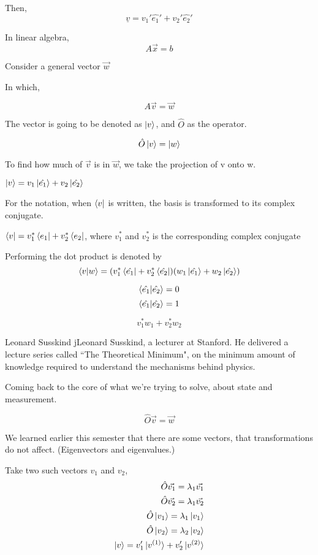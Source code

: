 \documentclass{report}
\begin{document}
Then, $$\underline{v} = v_1' \hat{e_1}' + v_2' \hat{e_2}'$$

 In linear algebra,
$$A\vec{x} = b$$

Consider a general vector $\vec{w}$

In which,

$$A\vec{v} = \vec{w}$$

The vector is going to be denoted as $\ket{v}$, and $\hat{O}$ as the operator.

$$\hat{O}\ket{v} = \ket{w}$$

To find how much of $\vec{v}$ is in $\vec{w}$, we take the projection of v onto w.

$\ket{v} = v_1 \ket{\hat{e_1}}+ v_2 \ket{\hat{e_2}}$

For the notation, when $\bra{v}$ is written, the basis is transformed to its complex conjugate.

$\bra{v} = v_1^* \bra{e_1} + v_2^*\bra{e_2}$, where $v_1^*$ and $v_2^*$ is the corresponding complex conjugate

Performing the dot product is denoted by $$\braket{v | w} = (v_1^*\bra{\hat{e_1}}+ v_2^*\bra{\hat{e_2}})(w_1 \ket{\hat{e_1}} + w_2 \ket{\hat{e_2}})$$

$$\braket{\hat{e_1} | \hat{e_2}}=0$$ $$\braket{\hat{e_1} | \hat{e_2}}=1$$

$$v_1^*w_1 + v_2^*w_2$$

\begin{Reference}{Leonard Susskind}
jLeonard Susskind, a lecturer at Stanford.
He delivered a lecture series called ``The Theoretical Minimum", on the minimum amount of knowledge required to understand the mechanisms behind physics.
\end{Reference}

Coming back to the core of what we're trying to solve, about state and measurement.

$$\hat{O}\vec{v} = \vec{w}$$

We learned earlier this semester that there are some vectors, that transformations do not affect. (Eigenvectors and eigenvalues.)

Take two such vectors $v_1$ and $v_2$,
\begin{align*}
\hat{O}\vec{v_1} = \lambda_1 \vec{v_1} \\
\hat{O}\vec{v_2} = \lambda_1 \vec{v_2} \\
\hat{O}\ket{v_1} = \lambda_1 \ket{v_1} \\
\hat{O}\ket{v_2} = \lambda_2 \ket{v_2} \\
\ket{v} = v_1' \ket{v^{(1)}}+v_2' \ket{v^{(2)}} \\
\end{align*}
\end{document}
